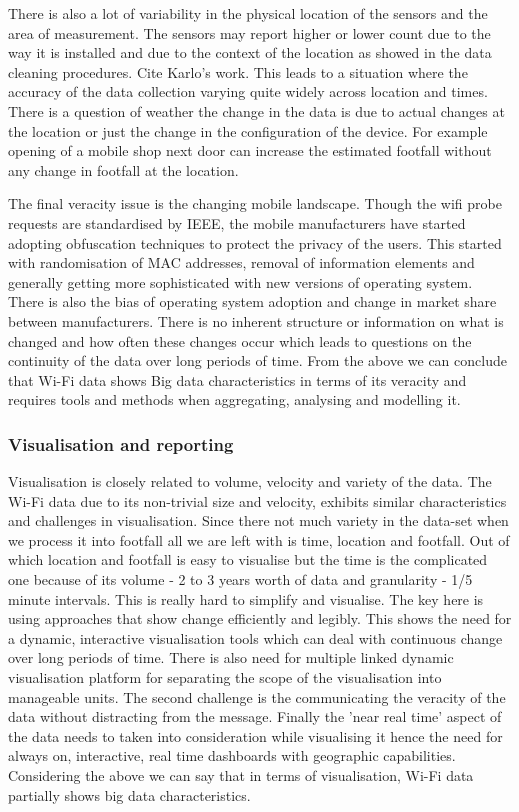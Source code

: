 There is also a lot of variability in the physical location of the sensors and the area of measurement.
The sensors may report higher or lower count due to the way it is installed and due to the context of the location as showed in the data cleaning procedures.
Cite Karlo's work.
This leads to a situation where the accuracy of the data collection varying quite widely across location and times.
There is a question of weather the change in the data is due to actual changes at the location or just the change in the configuration of the device.
For example opening of a mobile shop next door can increase the estimated footfall without any change in footfall at the location.

The final veracity issue is the changing mobile landscape.
Though the wifi probe requests are standardised by IEEE, the mobile manufacturers have started adopting obfuscation techniques to protect the privacy of the users.
This started with randomisation of MAC addresses, removal of information elements and generally getting more sophisticated with new versions of operating system.
There is also the bias of operating system adoption and change in market share between manufacturers.
There is no inherent structure or information on what is changed and how often these changes occur which leads to questions on the continuity of the data over long periods of time.
From the above we can conclude that Wi-Fi data shows Big data characteristics in terms of its veracity and requires tools and methods when aggregating, analysing and modelling it.


\subsubsection{Visualisation and reporting}

Visualisation is closely related to volume, velocity and variety of the data.
The Wi-Fi data due to its non-trivial size and velocity, exhibits similar characteristics and challenges in visualisation.
Since there not much variety in the data-set when we process it into footfall all we are left with is time, location and footfall.
Out of which location and footfall is easy to visualise but the time is the complicated one because of its volume - 2 to 3 years worth of data and granularity - 1/5 minute intervals.
This is really hard to simplify and visualise.
The key here is using approaches that show change efficiently and legibly.
This shows the need for a dynamic, interactive visualisation tools which can deal with continuous change over long periods of time.
There is also need for multiple linked dynamic visualisation platform for separating the scope of the visualisation into manageable units.
The second challenge is the communicating the veracity of the data without distracting from the message.
Finally the 'near real time' aspect of the data needs to taken into consideration while visualising it hence the need for always on, interactive, real time dashboards with geographic capabilities.
Considering the above we can say that in terms of visualisation, Wi-Fi data partially shows big data characteristics.

